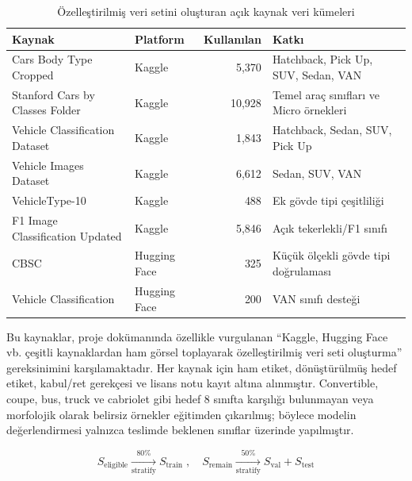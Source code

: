 \documentclass[conference]{IEEEtran}
\begin{document}
\begin{table}[t]
\centering
\footnotesize
\caption{Özelleştirilmiş veri setini oluşturan açık kaynak veri kümeleri}
\label{tab:source_datasets}
\begin{tabular}{@{}p{}p{}rp{}@{}}
\toprule
\textbf{Kaynak} & \textbf{Platform} & \textbf{Kullanılan} & \textbf{Katkı} \\ \midrule
Cars Body Type Cropped \cite{dataset_cars_body_type_cropped} & Kaggle & 5,370 & Hatchback, Pick Up, SUV, Sedan, VAN \\
Stanford Cars by Classes Folder \cite{krause2013cars,dataset_stanford_cars_folder} & Kaggle & 10,928 & Temel araç sınıfları ve Micro örnekleri \\
Vehicle Classification Dataset \cite{dataset_vehicle_classification_ihasib} & Kaggle & 1,843 & Hatchback, Sedan, SUV, Pick Up \\
Vehicle Images Dataset \cite{dataset_vehicle_images_lyensoetanto} & Kaggle & 6,612 & Sedan, SUV, VAN \\
VehicleType-10 \cite{competition_vehicletype10} & Kaggle & 488 & Ek gövde tipi çeşitliliği \\
F1 Image Classification Updated \cite{dataset_f1_updated} & Kaggle & 5,846 & Açık tekerlekli/F1 sınıfı \\
CBSC \cite{dataset_cbsc_hf} & Hugging Face & 325 & Küçük ölçekli gövde tipi doğrulaması \\
Vehicle Classification \cite{dataset_drbimmer_hf} & Hugging Face & 200 & VAN sınıfı desteği \\ \bottomrule
\end{tabular}
\end{table}

Bu kaynaklar, proje dokümanında özellikle vurgulanan ``Kaggle, Hugging Face vb. çeşitli kaynaklardan ham görsel toplayarak özelleştirilmiş veri seti oluşturma'' gereksinimini karşılamaktadır. Her kaynak için ham etiket, dönüştürülmüş hedef etiket, kabul/ret gerekçesi ve lisans notu kayıt altına alınmıştır. Convertible, coupe, bus, truck ve cabriolet gibi hedef 8 sınıfta karşılığı bulunmayan veya morfolojik olarak belirsiz örnekler eğitimden çıkarılmış; böylece modelin değerlendirmesi yalnızca teslimde beklenen sınıflar üzerinde yapılmıştır.

\begin{equation}
S_{\text{eligible}} \xrightarrow[\text{stratify}]{80\%} S_{\text{train}} \;,\quad 
S_{\text{remain}} \xrightarrow[\text{stratify}]{50\%} S_{\text{val}} + S_{\text{test}}
\label{eq:split}
\end{equation}
\end{document}

